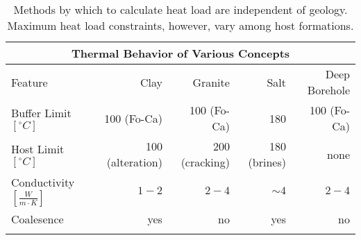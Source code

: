 %
\begin{table}[h!]
  \centering
  \footnotesize{
  \begin{tabular}{|l|r|r|r|r|}
    \multicolumn{5}{c}{\textbf{Thermal Behavior of Various Concepts}}\\
    \hline
    Feature & Clay & Granite & Salt & Deep Borehole \\ 
    \hline
    Buffer Limit $[^{\circ}C]$ & 100 (Fo-Ca) & 100 (Fo-Ca) & 180 & 100 (Fo-Ca) \\ 
    Host Limit $[^{\circ}C]$   & 100 (alteration)  & 200 (cracking) & 180 (brines) & none \\ 
    Conductivity $[\frac{W}{m{\cdot}K}]$ & $1-2$ & $2-4$ & $\sim4$  & $2-4$ \\ 
    Coalesence & yes & no & yes & no \\ 
    \hline
    \caption[Models for Heat Transport for Various Geologies]{Methods by which to calculate heat 
    load are independent of geology. Maximum heat load constraints, however, vary among host formations. }
  \end{tabular}
  }
  \label{tab:heat_tab}
\end{table}
